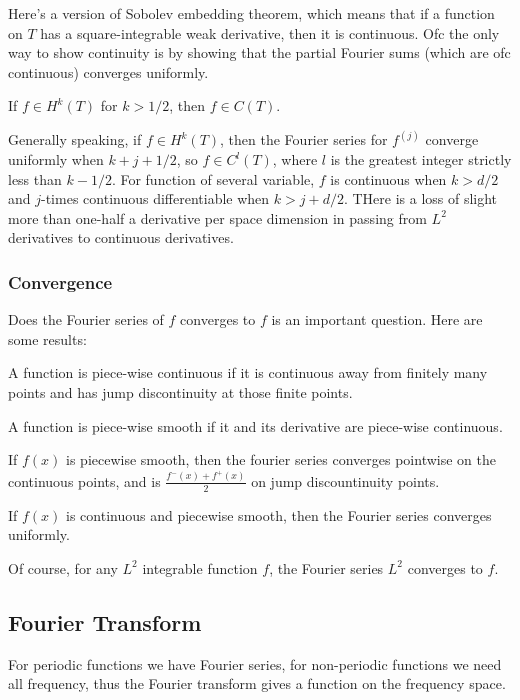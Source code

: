 \documentclass[main.tex]{subfiles}
\begin{document}
Here's a version of Sobolev embedding theorem, which means that if a function on $T$ has a square-integrable weak derivative, then it is continuous. Ofc the only way to show continuity is by showing that the partial Fourier sums (which are ofc continuous) converges uniformly.

\begin{theorem}
If $f \in H^k(T)$ for $k > 1/2$, then $f \in C(T)$.
\end{theorem}

Generally speaking, if $f \in H^k(T)$, then the Fourier series for $f^{(j)}$ converge uniformly when $k + j + 1/2$, so $f \in C^l(T)$, where $l$ is the greatest integer strictly less than $k - 1/2$. For function of several variable, $f$ is continuous when $k > d/2$ and $j$-times continuous differentiable when $k > j + d/2$. THere is a loss of slight more than one-half a derivative per space dimension in passing from $L^2$ derivatives to continuous derivatives.

\subsubsection{Convergence}
Does the Fourier series of $f$ converges to $f$ is an important question. Here are some results:

A function is piece-wise continuous if it is continuous away from finitely many points and has jump discontinuity at those finite points.

A function is piece-wise smooth if it and its derivative are piece-wise continuous.
\begin{theorem}
If $f(x)$ is piecewise smooth, then the fourier series converges pointwise on the continuous points, and is $\frac{f^-(x) + f^+(x)}{2}$ on jump discountinuity points.
\end{theorem}

\begin{theorem}
If $f(x)$ is continuous and piecewise smooth, then the Fourier series converges uniformly.
\end{theorem}

Of course, for any $L^2$ integrable function $f$, the Fourier series $L^2$ converges to $f$.

\subsection{Fourier Transform}
For periodic functions we have Fourier series, for non-periodic functions we need all frequency, thus the Fourier transform gives a function on the frequency space.
\end{document}
